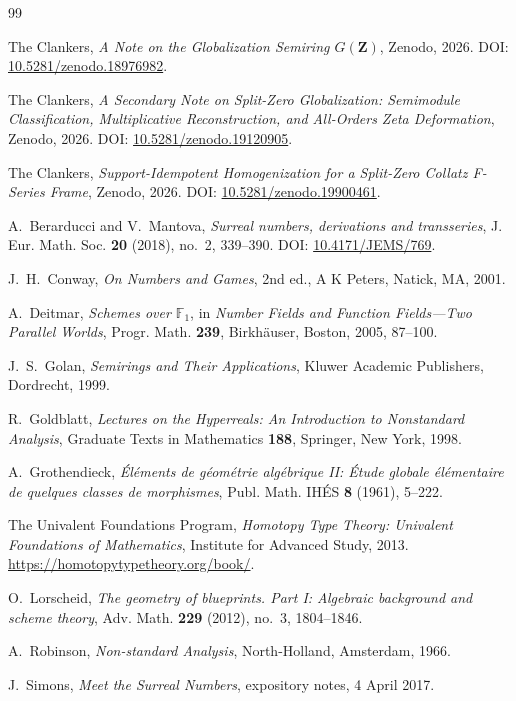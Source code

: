 \documentclass[11pt]{amsart}
\numberwithin{equation}{section}
\theoremstyle{definition}
\newcommand{\Z}{\mathbf Z}
\begin{document}
\begin{thebibliography}{99}

The Clankers,
\emph{A Note on the Globalization Semiring $G(\Z)$},
Zenodo, 2026.
DOI: \href{https://doi.org/10.5281/zenodo.18976982}{10.5281/zenodo.18976982}.

The Clankers,
\emph{A Secondary Note on Split-Zero Globalization: Semimodule Classification, Multiplicative Reconstruction, and All-Orders Zeta Deformation},
Zenodo, 2026.
DOI: \href{https://doi.org/10.5281/zenodo.19120905}{10.5281/zenodo.19120905}.

The Clankers,
\emph{Support-Idempotent Homogenization for a Split-Zero Collatz F-Series Frame},
Zenodo, 2026.
DOI: \href{https://doi.org/10.5281/zenodo.19900461}{10.5281/zenodo.19900461}.

A.~Berarducci and V.~Mantova,
\emph{Surreal numbers, derivations and transseries},
J. Eur. Math. Soc. \textbf{20} (2018), no.~2, 339--390.
DOI: \href{https://doi.org/10.4171/JEMS/769}{10.4171/JEMS/769}.

J.~H.~Conway,
\emph{On Numbers and Games},
2nd ed., A K Peters, Natick, MA, 2001.

A.~Deitmar,
\emph{Schemes over $\mathbb F_1$},
in \emph{Number Fields and Function Fields---Two Parallel Worlds},
Progr. Math. \textbf{239}, Birkh\"auser, Boston, 2005, 87--100.

J.~S.~Golan,
\emph{Semirings and Their Applications},
Kluwer Academic Publishers, Dordrecht, 1999.

R.~Goldblatt,
\emph{Lectures on the Hyperreals: An Introduction to Nonstandard Analysis},
Graduate Texts in Mathematics \textbf{188}, Springer, New York, 1998.

A.~Grothendieck,
\emph{\'El\'ements de g\'eom\'etrie alg\'ebrique II: \'Etude globale \'el\'ementaire de quelques classes de morphismes},
Publ. Math. IH\'ES \textbf{8} (1961), 5--222.

The Univalent Foundations Program,
\emph{Homotopy Type Theory: Univalent Foundations of Mathematics},
Institute for Advanced Study, 2013.
\url{https://homotopytypetheory.org/book/}.

O.~Lorscheid,
\emph{The geometry of blueprints. Part I: Algebraic background and scheme theory},
Adv. Math. \textbf{229} (2012), no.~3, 1804--1846.

A.~Robinson,
\emph{Non-standard Analysis},
North-Holland, Amsterdam, 1966.

J.~Simons,
\emph{Meet the Surreal Numbers},
expository notes, 4 April 2017.

\end{thebibliography}
\end{document}
